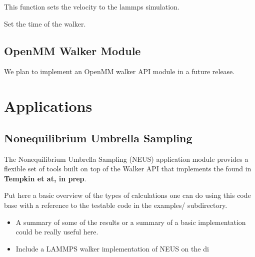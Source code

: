 \documentclass[letterpaper,10pt,english]{sphinxmanual}
\begin{document}
\begin{fulllineitems}
\begin{fulllineitems}
\end{fulllineitems}


\begin{fulllineitems}
\label{walker_api/walker_api.doc:lammpsWalker.lammpsWalker.setVel}
This function sets the velocity to the lammps simulation.

\end{fulllineitems}


\begin{fulllineitems}
\label{walker_api/walker_api.doc:lammpsWalker.lammpsWalker.set_time}
Set the time of the walker.

\end{fulllineitems}


\end{fulllineitems}



\section{OpenMM Walker Module}
\label{walker_api/walker_api.doc:openmm-walker-module}
We plan to implement an OpenMM walker API module in a future release.


\chapter{Applications}
\label{applications/applications.doc:applications}\label{applications/applications.doc::doc}

\section{Nonequilibrium Umbrella Sampling}
\label{applications/applications.doc:nonequilibrium-umbrella-sampling}
The Nonequilibrium Umbrella Sampling (NEUS) application module provides a flexible set of tools built on top of the Walker API that implements the found in \textbf{Tempkin et at, in prep}.

Put here a basic overview of the types of calculations one can do using this code base with a reference to the testable code in the examples/ subdirectory.
\begin{itemize}
\item {} 
A summary of some of the results or a summary of a basic implementation could be really useful here.

\item {} 
Include a LAMMPS walker implementation of NEUS on the di

\end{itemize}
\end{document}
